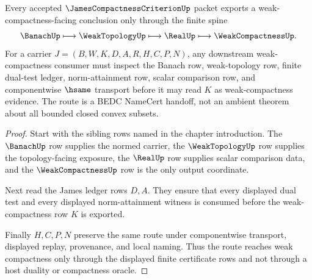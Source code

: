 \begin{theorem}
\label{thm:james-compactness-criterion-weak-compactness-route}
Every accepted $\JamesCompactnessCriterionUp$ packet exports a weak-compactness-facing conclusion only through the finite spine
$$
\BanachUp \longmapsto
\WeakTopologyUp \longmapsto
\RealUp \longmapsto
\WeakCompactnessUp .
$$
For a carrier $J=(B,W,K,D,A,R,H,C,P,N)$, any downstream weak-compactness consumer must inspect the Banach row, weak-topology row, finite dual-test ledger, norm-attainment row, scalar comparison row, and componentwise $\hsame$ transport before it may read $K$ as weak-compactness evidence. The route is a BEDC NameCert handoff, not an ambient theorem about all bounded closed convex subsets.
\end{theorem}
\begin{proof}
Start with the sibling rows named in the chapter introduction. The $\BanachUp$ row supplies the normed carrier, the $\WeakTopologyUp$ row supplies the topology-facing exposure, the $\RealUp$ row supplies scalar comparison data, and the $\WeakCompactnessUp$ row is the only output coordinate.

Next read the James ledger rows $D,A$. They ensure that every displayed dual test and every displayed norm-attainment witness is consumed before the weak-compactness row $K$ is exported.

Finally $H,C,P,N$ preserve the same route under componentwise transport, displayed replay, provenance, and local naming. Thus the route reaches weak compactness only through the displayed finite certificate rows and not through a host duality or compactness oracle.
\end{proof}




